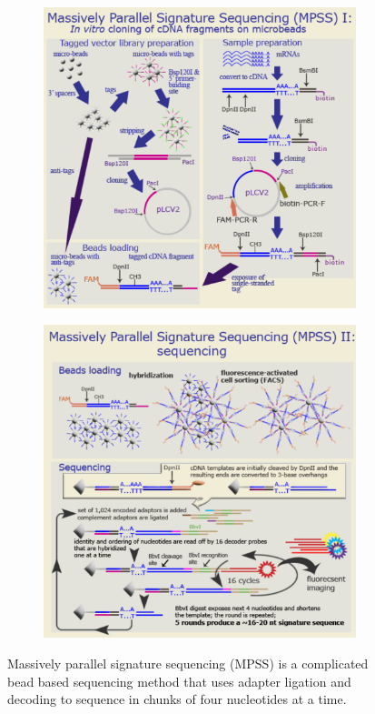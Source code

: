 \documentclass{report}\usepackage[]{graphicx}\usepackage[]{color}
\begin{document}
 \begin{figure}[H]
\centering
  \begin{subfigure}[b]{.5\linewidth}
    \centering
    \includegraphics[width=.8\textwidth]{images/MPSS1.pdf}
  \end{subfigure}%
  \begin{subfigure}[b]{.5\linewidth}
    \centering
    \includegraphics[width=.8\textwidth]{images/MPSS2.pdf}
  \end{subfigure}%
  \caption{Massively parallel signature sequencing (MPSS) is a 
complicated bead based sequencing method that uses adapter ligation 
and decoding to sequence in chunks
of four nucleotides at a time. }\label{fig:MPSS}
\end{figure}
\end{document}
